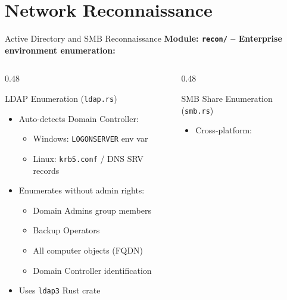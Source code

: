 \documentclass[aspectratio=169]{beamer}
\newcommand{\code}[1]{\texttt{\textcolor{primaryblue}{#1}}}
\begin{document}
\section{Network Reconnaissance}

\begin{frame}{Active Directory and SMB Reconnaissance}
  \textbf{Module: \code{recon/} -- Enterprise environment enumeration:}

  \vspace{0.5em}
  \begin{columns}[T]
    \begin{column}{0.48\textwidth}
      \begin{block}{LDAP Enumeration (\code{ldap.rs})}
        \footnotesize
        \begin{itemize}
          \item Auto-detects Domain Controller:
          \begin{itemize}
            \item Windows: \code{LOGONSERVER} env var
            \item Linux: \code{krb5.conf} / DNS SRV records
          \end{itemize}
          \item Enumerates without admin rights:
          \begin{itemize}
            \item Domain Admins group members
            \item Backup Operators
            \item All computer objects (FQDN)
            \item Domain Controller identification
          \end{itemize}
          \item Uses \code{ldap3} Rust crate
        \end{itemize}
      \end{block}
    \end{column}
    \begin{column}{0.48\textwidth}
      \begin{block}{SMB Share Enumeration (\code{smb.rs})}
        \footnotesize
        \begin{itemize}
          \item Cross-platform:
          \begin{itemize}

\end{itemize}
\end{itemize}
\end{block}
\end{column}
\end{columns}
\end{frame}
\end{document}
